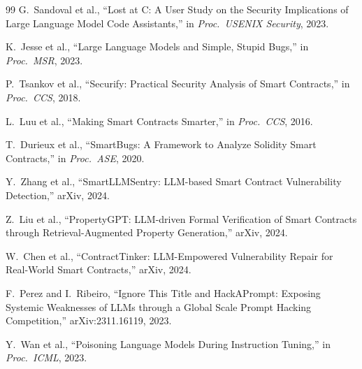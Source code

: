 \documentclass[11pt]{article}
\begin{document}
{\begin{thebibliography}{99}
 G.~Sandoval et al., ``Lost at C: A User Study on the Security Implications of Large Language Model Code Assistants,'' in \textit{Proc.\ USENIX Security}, 2023.

 K.~Jesse et al., ``Large Language Models and Simple, Stupid Bugs,'' in \textit{Proc.\ MSR}, 2023.

 P.~Tsankov et al., ``Securify: Practical Security Analysis of Smart Contracts,'' in \textit{Proc.\ CCS}, 2018.

 L.~Luu et al., ``Making Smart Contracts Smarter,'' in \textit{Proc.\ CCS}, 2016.

 T.~Durieux et al., ``SmartBugs: A Framework to Analyze Solidity Smart Contracts,'' in \textit{Proc.\ ASE}, 2020.

 Y.~Zhang et al., ``SmartLLMSentry: LLM-based Smart Contract Vulnerability Detection,'' arXiv, 2024.

 Z.~Liu et al., ``PropertyGPT: LLM-driven Formal Verification of Smart Contracts through Retrieval-Augmented Property Generation,'' arXiv, 2024.

 W.~Chen et al., ``ContractTinker: LLM-Empowered Vulnerability Repair for Real-World Smart Contracts,'' arXiv, 2024.

 F.~Perez and I.~Ribeiro, ``Ignore This Title and HackAPrompt: Exposing Systemic Weaknesses of LLMs through a Global Scale Prompt Hacking Competition,'' arXiv:2311.16119, 2023.

 Y.~Wan et al., ``Poisoning Language Models During Instruction Tuning,'' in \textit{Proc.\ ICML}, 2023.

\end{thebibliography}
}
\end{document}
